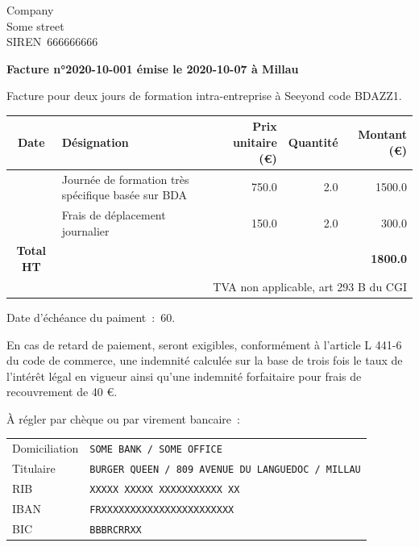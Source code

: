 \documentclass[11pt,a4paper]{scrlttr2}
\begin{document}
\begin{letter}{%
    Company\\%
    Some street\\%
    SIREN~666666666%
  }
  \opening{\textbf{Facture n°2020-10-001 émise le 2020-10-07 à Millau}}
  Facture pour deux jours de formation intra-entreprise à Seeyond code BDAZZ1.

  \begin{tabularx}{\textwidth}{cXrrr}
    \toprule
    \textbf{Date}       & \textbf{Désignation}       & \textbf{Prix unitaire (€)} & \textbf{Quantité} & \textbf{Montant (€)}     \\
    \midrule
     & Journée de formation très spécifique basée sur BDA & 750.0          & 2.0  & 1500.0             \\
     & Frais de déplacement journalier & 150.0          & 2.0  & 300.0             \\
    \addlinespace
    \textbf{Total HT}   &                            &                            &                   & \textbf{1800.0} \\
    \bottomrule
    \multicolumn{5}{r}{\small{TVA non applicable, art 293 B du CGI}}                                                             \\
  \end{tabularx}

  Date d'échéance du paiment~:~60.

  En cas de retard de paiement, seront exigibles, conformément à l’article L 441-6 du code de commerce,
  une indemnité calculée sur la base de trois fois le taux de l’intérêt légal en vigueur ainsi qu’une indemnité
  forfaitaire pour frais de recouvrement de 40 €.

  À régler par chèque ou par virement bancaire~:

  \begin{tabular}{ll}
    Domiciliation & \texttt{SOME BANK / SOME OFFICE}  \\
    Titulaire     & \texttt{BURGER QUEEN / 809 AVENUE DU LANGUEDOC / MILLAU} \\
    RIB           & \texttt{XXXXX XXXXX XXXXXXXXXXX XX}           \\
    IBAN          & \texttt{FRXXXXXXXXXXXXXXXXXXXXXXX}                  \\
    BIC           & \texttt{BBBRCRRXX}                   \\
  \end{tabular}
\end{letter}
\end{document}
